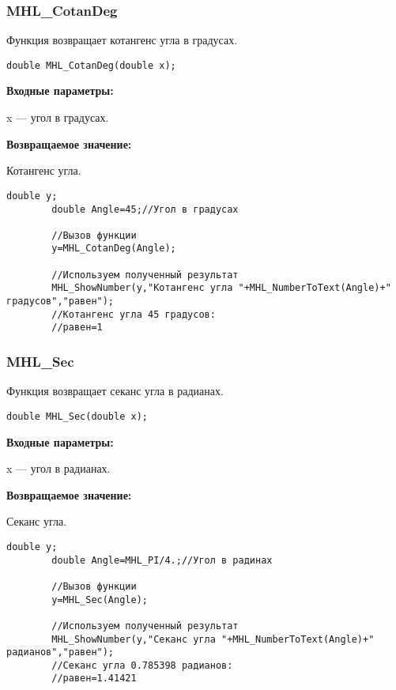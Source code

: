 \documentclass[a4paper,12pt]{article}
\begin{document}
\subsubsection{MHL\_CotanDeg}\label{MHL_CotanDeg}

Функция возвращает котангенс угла в градусах.


\begin{lstlisting}[label=code_syntax_MHL_CotanDeg,caption=Синтаксис]
double MHL_CotanDeg(double x);
\end{lstlisting}

\textbf{Входные параметры:}

 x --- угол в градусах.

\textbf{Возвращаемое значение:}

Котангенс угла.


\begin{lstlisting}[label=code_use_MHL_CotanDeg,caption=Пример использования]
        double y;
        double Angle=45;//Угол в градусах

        //Вызов функции
        y=MHL_CotanDeg(Angle);

        //Используем полученный результат
        MHL_ShowNumber(y,"Котангенс угла "+MHL_NumberToText(Angle)+" градусов","равен");
        //Котангенс угла 45 градусов:
        //равен=1
\end{lstlisting}

\subsubsection{MHL\_Sec}\label{MHL_Sec}

Функция возвращает секанс угла в радианах.


\begin{lstlisting}[label=code_syntax_MHL_Sec,caption=Синтаксис]
double MHL_Sec(double x);
\end{lstlisting}

\textbf{Входные параметры:}

 x --- угол в радианах.

\textbf{Возвращаемое значение:}

Секанс угла.


\begin{lstlisting}[label=code_use_MHL_Sec,caption=Пример использования]
        double y;
        double Angle=MHL_PI/4.;//Угол в радинах

        //Вызов функции
        y=MHL_Sec(Angle);

        //Используем полученный результат
        MHL_ShowNumber(y,"Секанс угла "+MHL_NumberToText(Angle)+" радианов","равен");
        //Секанс угла 0.785398 радианов:
        //равен=1.41421
\end{lstlisting}
\end{document}
